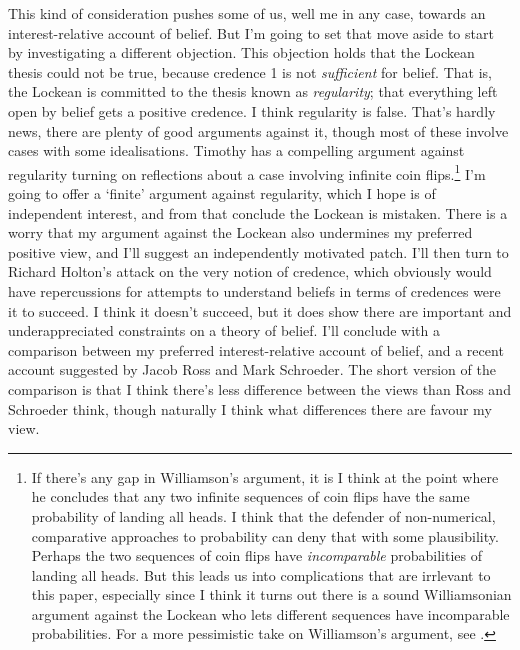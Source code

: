 This kind of consideration pushes some of us, well me in any case, towards an interest-relative account of belief. But I'm going to set that move aside to start by investigating a different objection. This objection holds that the Lockean thesis could not be true, because credence 1 is not \textit{sufficient} for belief. That is, the Lockean is committed to the thesis known as \textit{regularity}; that everything left open by belief gets a positive credence. I think regularity is false. That's hardly news, there are plenty of good arguments against it, though most of these involve cases with some idealisations. Timothy \citet{Williamson2007-WILHPI} has a compelling argument against regularity turning on reflections about a case involving infinite coin flips.\footnote{If there's any gap in Williamson's argument, it is I think at the point where he concludes that any two infinite sequences of coin flips have the same probability of landing all heads. I think that the defender of non-numerical, comparative approaches to probability can deny that with some plausibility. Perhaps the two sequences of coin flips have \textit{incomparable} probabilities of landing all heads. But this leads us into complications that are irrlevant to this paper, especially since I think it turns out there is a sound Williamsonian argument against the Lockean who lets different sequences have incomparable probabilities. For a more pessimistic take on Williamson's argument, see \citet{Weintraub2008}.} I'm going to offer a `finite' argument against regularity, which I hope is of independent interest, and from that conclude the Lockean is mistaken. There is a worry that my argument against the Lockean also undermines my preferred positive view, and I'll suggest an independently motivated patch. I'll then turn to Richard Holton's attack on the very notion of credence, which obviously would have repercussions for attempts to understand beliefs in terms of credences were it to succeed. I think it doesn't succeed, but it does show there are important and underappreciated constraints on a theory of belief. I'll conclude with a comparison between my preferred interest-relative account of belief, and a recent account suggested by Jacob Ross and Mark Schroeder. The short version of the comparison is that I think there's less difference between the views than Ross and Schroeder think, though naturally I think what differences there are favour my view.

